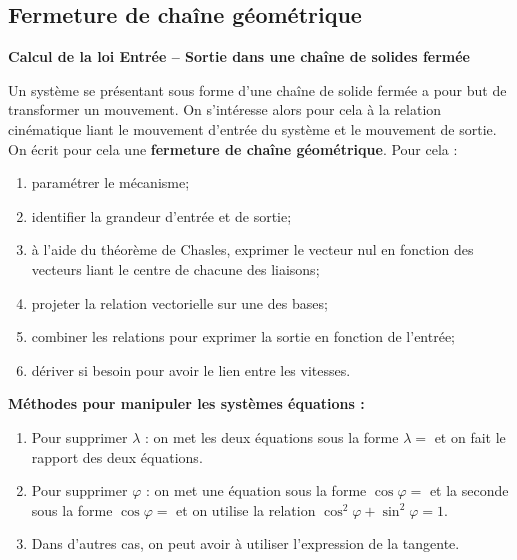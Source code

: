 \documentclass[10pt,oneside]{article}
\begin{document}
\subsection{Fermeture de chaîne géométrique}


\begin{methode}
\textbf{Calcul de la loi Entrée -- Sortie dans une chaîne de solides fermée}

Un système se présentant sous forme d'une chaîne de solide fermée a pour but de transformer un mouvement. On s'intéresse alors pour cela à la relation cinématique liant le mouvement d'entrée du système et le mouvement de sortie. On écrit pour cela une \textbf{fermeture de chaîne géométrique}. Pour cela :
\begin{enumerate}
\item paramétrer le mécanisme;
\item identifier la grandeur d'entrée et de sortie;
\item à l'aide du théorème de Chasles, exprimer le vecteur nul en fonction des vecteurs liant le centre de chacune des liaisons;
\item projeter la relation vectorielle sur une des bases;
\item combiner les relations pour exprimer la sortie en fonction de l'entrée;
\item dériver si besoin pour avoir le lien entre les vitesses. 
\end{enumerate}
\end{methode}


\begin{methode}
\textbf{Méthodes pour manipuler les systèmes équations :} 
\begin{enumerate}
\item Pour supprimer $\lambda$ : on met les deux équations sous la forme $\lambda =$ et on fait le rapport des deux équations.
\item Pour supprimer $\varphi$ : on met une équation sous la forme $\cos\varphi = $ et la seconde sous la forme $\cos\varphi = $ et on utilise la relation $\cos^2\varphi +\sin^2\varphi =1 $.
\item Dans d'autres cas, on peut avoir à utiliser l'expression de la tangente.
\end{enumerate}
\end{methode}
\end{document}
